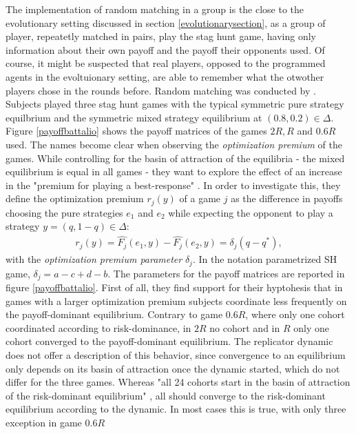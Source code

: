 \documentclass[11pt]{article}
\begin{document}
The implementation of random matching in a group is the close to the 
evolutionary setting discussed in section \ref{evolutionarysection}, as a 
group of player, repeatetly matched in pairs, play the stag hunt 
game, having only information about their own payoff and the payoff their
opponents used. Of course, it might be suspected that real players, opposed
to the programmed agents in the evoltuionary setting, are able to remember
what the otwother players chose in the rounds before. 
Random matching was conducted by \textcite{battalio_optimization_2001}. 
Subjects played three stag hunt games with the typical symmetric pure strategy
equilbrium and the symmetric mixed strategy equilibrium at $(0.8,0.2) \in
\Delta$. Figure \ref{payoffbattalio} shows the payoff matrices of the
games $2R, R$ and $0.6R$ used. The names become clear when observing the 
\textit{optimization premium} of the games. While controlling for the basin of 
attraction of the equilibria - the mixed equilibrium is equal in all games -
they want to explore the effect of an increase in the "premium for playing
a best-response" \parencite[751]{battalio_optimization_2001}. 
In order to investigate this, they define the optimization premium $r_j(y)$ of 
a game $j$ as the difference in payoffs choosing the pure strategies 
$e_1$ and $e_2$ while expecting the opponent to play a strategy 
$y=(q,1-q) \in \Delta$:
\begin{align}
        r_j(y)= \hat{F_j}(e_1,y) - \hat{F_j}(e_2,y) = \delta_j(q-q^*),
\end{align}
with the \textit{optimization premium parameter} $\delta_j$. In the notation
parametrized SH game, $\delta_j = a - c + d - b$.
The parameters for the payoff matrices are reported in figure 
\ref{payoffbattalio}. 
First of all, they find support for their hyptohesis that in games with a 
larger optimization premium subjects coordinate less frequently on the 
payoff-dominant equilibrium. 
Contrary to game $0.6R$, where only one cohort coordinated according 
to risk-dominance, in $2R$ no cohort and in $R$ only one cohort converged to the 
payoff-dominant equilibrium. The replicator dynamic does not offer 
a description of this behavior, since convergence to an equilibrium only 
depends on its basin of attraction once the dynamic started, 
which do not differ for the three games. 
Whereas "all 24 cohorts start in the basin of attraction
of the risk-dominant equilibrium" \parencite{battalio_optimization_2001}, 
all should converge to the risk-dominant equilibrium according to the dynamic.
In most cases this is true, with only three exception in game $0.6R$ 
\end{document}
